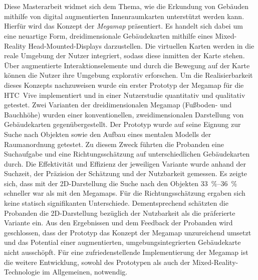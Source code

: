 \chapter*{\abstractname}
\thispagestyle{empty}

Diese Masterarbeit widmet sich dem Thema, wie die Erkundung von Gebäuden mithilfe von digital augmentierten Innenraumkarten unterstützt werden kann.
Hierfür wird das Konzept der \emph{Megamap} präsentiert.
Es handelt sich dabei um eine neuartige Form, dreidimensionale Gebäudekarten mithilfe eines Mixed-Reality Head-Mounted-Displays darzustellen.
Die virtuellen Karten werden in die reale Umgebung der Nutzer integriert, sodass diese inmitten der Karte stehen.
Über augmentierte Interaktionselemente und durch die Bewegung auf der Karte können die Nutzer ihre Umgebung explorativ erforschen.
Um die Realisierbarkeit dieses Konzepts nachzuweisen wurde ein erster Prototyp der Megamap für die HTC~Vive implementiert und in einer Nutzerstudie quantitativ und qualitativ getestet.
Zwei Varianten der dreidimensionalen Megamap (Fußboden- und Bauchhöhe) wurden einer konventionellen, zweidimensionalen Darstellung von Gebäudekarten gegenübergestellt.
Der Prototyp wurde auf seine Eignung zur Suche nach Objekten sowie den Aufbau eines mentalen Modells der Raumanordnung getestet.
Zu diesem Zweck führten die Probanden eine Suchaufgabe und eine Richtungsschätzung auf unterschiedlichen Gebäudekarten durch.
Die Effektivität und Effizienz der jeweiligen Variante wurde anhand der Suchzeit, der Präzision der Schätzung und der Nutzbarkeit gemessen.
Es zeigte sich, dass mit der 2D-Darstellung die Suche nach den Objekten \SIrange{33}{36}{\percent} schneller war als mit den Megamaps.
Für die Richtungsschätzung ergaben sich keine statisch signifikanten Unterschiede.
Dementsprechend schätzten die Probanden die 2D-Darstellung bezüglich der Nutzbarkeit als die präferierte Variante ein.
Aus den Ergebnissen und dem Feedback der Probanden wird geschlossen, dass der Prototyp das Konzept der Megamap unzureichend umsetzt und das Potential einer augmentierten, umgebungsintegrierten Gebäudekarte nicht ausschöpft.
Für eine zufriedenstellende Implementierung der Megamap ist die weitere Entwicklung, sowohl des Prototypen als auch der Mixed-Reality-Technologie im Allgemeinen, notwendig.

\cleardoublepage

